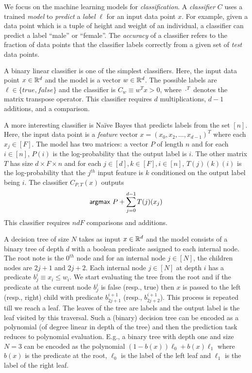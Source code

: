 We focus on the machine learning models for {\it classification}.
A {\it classifier} $C$ uses a trained {\it model} to {\it predict} a {\it label} $\ell$ for an input data point $x$. For example, given a data point which is a tuple of height and weight of an individual,
a classifier can predict a label ``male'' or ``female''. The {\it accuracy} of a classifier
refers to the fraction of data points that the classifier labels correctly from a given set of {\it test} data points.

A binary linear classifier is one of the simplest classifiers. Here, the input data point $x\in{\mathbb{R}}^d$
and the model is a vector $w\in{\mathbb{R}}^d$. The possible labels are $\ell\in\{\mathit{true},\mathit{false}\}$
and the classifier is $C_w\equiv w^Tx>0$, where $\cdot^T$ denotes the matrix transpose operator.
This classifier requires $d$ multiplications, $d-1$ additions, and a comparison.

A more interesting classifier is Na\"{i}ve Bayes that predicts labels from the set $[n]$.
Here, the input data point is a {\it feature}
vector $x=(x_0,x_2,\ldots,x_{d-1})^T$ where each $x_j\in [F]$.
The model has two matrices: a vector $P$ of length $n$ and for each $i \in [n]$, $P(i)$ is the log-probability that the output label is $i$.
The other matrix $T$ has size $d\times F\times n$ and for each $j\in [d], k\in [F], i\in [n]$, $T(j)(k)(i)$ is
the log-probability that  the $j^{th}$ input feature is $k$  conditioned on  the output label being $i$.
The classifier $C_{P,T}(x)$ outputs
\[
{\sf argmax}\ P+\sum_{j=0}^{d-1} T(j)(x_j)
\]
This classifier requires $ndF$ comparisons and additions.  

A decision tree of size $N$ takes as input $x\in{\mathbb{R}}^d$ and the model consists of a binary tree of depth $d$ with a boolean predicate
assigned to each internal node. The root note is the $0^{th}$ node and for an internal node $j \in [N]$, the children nodes are $2j+1$ and $2j+2$. Each internal node $j\in[N]$ at depth $i$ has a predicate $b_{j}^i\equiv x_i\leq w_i$. We start evaluating the tree from the root and if the predicate at the current node $b_j^i$ is false (resp., true) then $x$ is passed to the left (resp., right) child with predicate $b_{2j+1}^{i+1}$ (resp., $b_{2j+2}^{i+1}$). This process is repeated till we reach a leaf. The leaves of the tree are labels and the output label is the leaf visited by this traversal.
Such a (binary) decision tree can be encoded as a polynomial (of degree linear in depth of the tree) and then the prediction task
reduces to polynomial evaluation. E.g., a binary tree with depth one and size $N=3$ can be encoded as the polynomial
$(1-b(x))\ell_0 + b(x)\ell_1$ where $b(x)$ is the predicate at the root, $\ell_0$ is the label of the left leaf and $\ell_1$ is the label of the right leaf.

